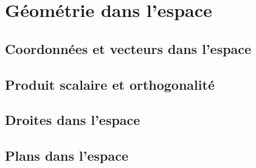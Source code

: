 \documentclass[oneside,12pt]{article}
\begin{document}
\section{Géométrie dans l'espace}

\subsection{Coordonnées et vecteurs dans l'espace}

\subsection{Produit scalaire et orthogonalité}

\subsection{Droites dans l'espace}

\subsection{Plans dans l'espace}
\end{document}
